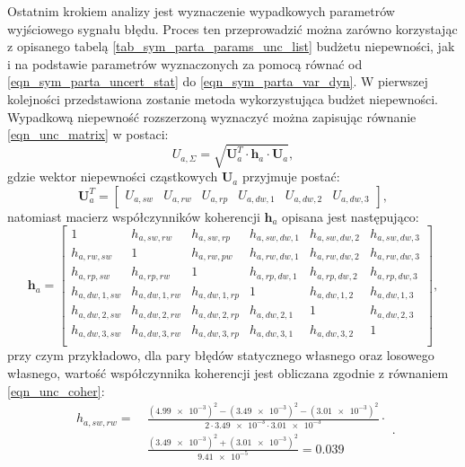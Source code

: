 Ostatnim krokiem analizy jest wyznaczenie wypadkowych parametrów wyjściowego sygnału błędu. Proces ten przeprowadzić można zarówno korzystając z opisanego tabelą \ref{tab_sym_parta_params_unc_list} budżetu niepewności, jak i na podstawie parametrów wyznaczonych za pomocą równać od \eqref{eqn_sym_parta_uncert_stat} do \eqref{eqn_sym_parta_var_dyn}. W pierwszej kolejności przedstawiona zostanie metoda wykorzystująca budżet niepewności. Wypadkową niepewność rozszerzoną wyznaczyć można zapisując równanie \eqref{eqn_unc_matrix} w postaci:
\begin{equation}
U_{a,\Sigma} = \sqrt{\mathbf{U}_{a}^{T} \cdot \mathbf{h}_{a} \cdot \mathbf{U}_{a}} \label{eqn_sym_parta_uncert_sum},
\end{equation}
gdzie wektor niepewności cząstkowych $\mathbf{U}_{a}$ przyjmuje postać:
\begin{equation}
\mathbf{U}_{a}^{T} =
\begin{bmatrix}
U_{a,sw} & U_{a,rw} & U_{a,rp} & U_{a,dw,1} & U_{a,dw,2} & U_{a,dw,3}
\end{bmatrix}
\label{eqn_sym_parta_uncert_vector},
\end{equation}
natomiast macierz współczynników koherencji $\mathbf{h}_{a}$ opisana jest następująco:
\begin{equation}
\mathbf{h}_{a} =
\begin{bmatrix}
1             & h_{a,sw,rw}   & h_{a,sw,rp}   & h_{a,sw,dw,1} & h_{a,sw,dw,2} & h_{a,sw,dw,3} \\
h_{a,rw,sw}   & 1             & h_{a,rw,pw}   & h_{a,rw,dw,1} & h_{a,rw,dw,2} & h_{a,rw,dw,3} \\
h_{a,rp,sw}   & h_{a,rp,rw}   & 1             & h_{a,rp,dw,1} & h_{a,rp,dw,2} & h_{a,rp,dw,3} \\
h_{a,dw,1,sw} & h_{a,dw,1,rw} & h_{a,dw,1,rp} & 1             & h_{a,dw,1,2}  & h_{a,dw,1,3}  \\
h_{a,dw,2,sw} & h_{a,dw,2,rw} & h_{a,dw,2,rp} & h_{a,dw,2,1}  & 1             & h_{a,dw,2,3}  \\
h_{a,dw,3,sw} & h_{a,dw,3,rw} & h_{a,dw,3,rp} & h_{a,dw,3,1}  & h_{a,dw,3,2}  & 1             \\
\end{bmatrix}
\label{eqn_sym_parta_uncert_coher},
\end{equation}
przy czym przykładowo, dla pary błędów statycznego własnego oraz losowego własnego, wartość współczynnika koherencji jest obliczana zgodnie z równaniem \eqref{eqn_unc_coher}:
\begin{equation}
\begin{split}
h_{a,sw,rw} = ~
& \frac{(\num{4.99e-3})^{2} - (\num{3.49e-3})^{2} - (\num{3.01e-3})^{2}}{2 \cdot \num{3.49e-3} \cdot \num{3.01e-3}} \cdot \\
& \frac{(\num{3.49e-3})^{2} + (\num{3.01e-3})^{2}}{\num{9.41e-5}} = 0.039
\end{split}
\label{eqn_sym_parta_coher_sw_rw}.
\end{equation}
